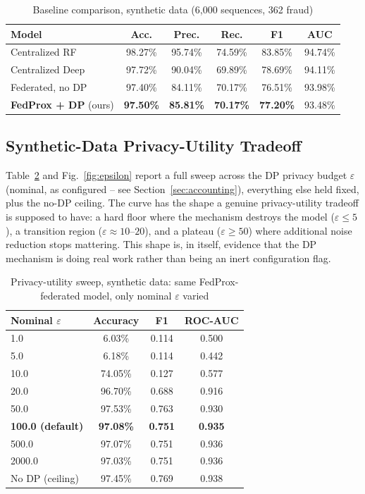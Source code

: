 \documentclass[12pt]{svproc}
\begin{document}
\begin{table}[!t]
\caption{Baseline comparison, synthetic data (6{,}000 sequences, 362 fraud)}
\label{tab:comparison}
\centering
\begin{tabular}{@{}lccccc@{}}
\toprule
Model & Acc. & Prec. & Rec. & F1 & AUC \\
\midrule
Centralized RF          & 98.27\% & 95.74\% & 74.59\% & 83.85\% & 94.74\% \\
Centralized Deep        & 97.72\% & 90.04\% & 69.89\% & 78.69\% & 94.11\% \\
Federated, no DP        & 97.40\% & 84.11\% & 70.17\% & 76.51\% & 93.98\% \\
\textbf{FedProx + DP} (ours) & \textbf{97.50\%} & \textbf{85.81\%} & \textbf{70.17\%} & \textbf{77.20\%} & 93.48\% \\
\bottomrule
\end{tabular}
\end{table}

\subsection{Synthetic-Data Privacy-Utility Tradeoff}
\label{sec:epsilon}
Table~\ref{tab:epsilon} and Fig.~\ref{fig:epsilon} report a full sweep
across the DP privacy budget $\varepsilon$ (nominal, as configured --
see Section~\ref{sec:accounting}), everything else held fixed, plus the
no-DP ceiling. The curve has the shape a genuine privacy-utility
tradeoff is supposed to have: a hard floor where the mechanism destroys
the model ($\varepsilon \le 5$), a transition region
($\varepsilon \approx 10$--$20$), and a plateau ($\varepsilon \ge 50$)
where additional noise reduction stops mattering. This shape is, in
itself, evidence that the DP mechanism is doing real work rather than
being an inert configuration flag.

\begin{table}[!t]
\caption{Privacy-utility sweep, synthetic data: same FedProx-federated model, only nominal $\varepsilon$ varied}
\label{tab:epsilon}
\centering
\begin{tabular}{@{}lccc@{}}
\toprule
Nominal $\varepsilon$ & Accuracy & F1 & ROC-AUC \\
\midrule
1.0    & 6.03\%  & 0.114 & 0.500 \\
5.0    & 6.18\%  & 0.114 & 0.442 \\
10.0   & 74.05\% & 0.127 & 0.577 \\
20.0   & 96.70\% & 0.688 & 0.916 \\
50.0   & 97.53\% & 0.763 & 0.930 \\
\textbf{100.0 (default)} & \textbf{97.08\%} & \textbf{0.751} & \textbf{0.935} \\
500.0  & 97.07\% & 0.751 & 0.936 \\
2000.0 & 97.03\% & 0.751 & 0.936 \\
No DP (ceiling) & 97.45\% & 0.769 & 0.938 \\
\bottomrule
\end{tabular}
\end{table}
\end{document}
